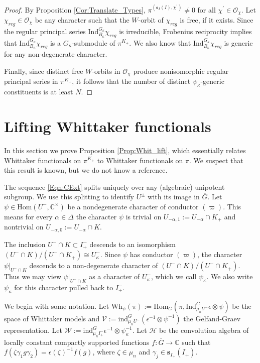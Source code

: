 \documentclass[11pt]{amsart}
\theoremstyle{plain}
\theoremstyle{definition}
\numberwithin{equation}{section}
\newcommand{\C}{\mathbb{C}}
\newcommand{\Gt}{\overline{G}}
\newcommand{\s}{\mathbf{s}}
\newcommand{\Ocal}{\mathcal{O}}
\newcommand{\Hcal}{\mathcal{H}}
\begin{document}
\begin{proof}
    By Proposition \ref{Cor:Translate_Types}, $\pi^{(\s_{I}(I),\chi^{\prime})}\neq 0$ for all $\chi^{\prime}\in \Ocal_{\chi}$. Let $\chi_{reg}\in \Ocal_{\chi}$ be any character such that the $W$-orbit of $\chi_{reg}$ is free, if it exists. Since the regular principal series $\mathrm{Ind}_{B_{\kappa}}^{G_{\kappa}}\chi_{reg}$ is irreducible, Frobenius reciprocity implies that  $\mathrm{Ind}_{B_{\kappa}}^{G_{\kappa}}\chi_{reg}$ is a $G_{\kappa}$-submodule of $\pi^{K_{+}}$. We also know that $\mathrm{Ind}_{B_{\kappa}}^{G_{\kappa}}\chi_{reg}$ is generic for any non-degenerate character. %

    Finally, since distinct free $W$-orbits in $\Ocal_{\chi}$ produce nonisomorphic regular principal series in $\pi^{K_{+}}$, it follows that the number of distinct $\psi_{\kappa}$-generic constituents is at least $N$.
\end{proof}

\section{Lifting Whittaker functionals}

In this section we prove Proposition \ref{Prop:Whit_lift}, which essentially relates Whittaker functionals on $\pi^{K_{+}}$ to Whittaker functionals on $\pi$. We suspect that this result is known, but we do not know a reference.

The sequence \eqref{Eqn:CExt} splits uniquely over any (algebraic) unipotent subgroup. We use this splitting to identify $U^{\pm}$ with its image in $\Gt$. Let $\psi\in\mathrm{Hom}(U^{-},\C^{\times})$ be a nondegenerate character of conductor $(\varpi)$. This means for every $\alpha\in\Delta$ the character $\psi$ is trivial on $U_{-\alpha,1}:=U_{-\alpha}\cap K_{+}$ and nontrivial on $U_{-\alpha,0}:=U_{-\alpha}\cap K$.

The inclusion $U^{-}\cap K\subset I^{-}_{+}$ descends to an isomorphism $(U^{-}\cap K)/(U^{-}\cap K_{+})\cong U^{-}_{\kappa}$. Since $\psi$ has conductor $(\varpi)$, the character $\psi|_{U^{-}\cap K}$ descends to a non-degenerate character of $(U^{-}\cap K)/(U^{-}\cap K_{+})$. Thus we may view $\psi|_{U^{-}\cap K}$ as a character of $U^{-}_{\kappa}$, which we call $\psi_{\kappa}$. We also write $\psi_{\kappa}$ for this character pulled back to $I^{-}_{+}$.

We begin with some notation. Let $\mathrm{Wh}_{\psi}(\pi):=\mathrm{Hom}_{G}(\pi,\mathrm{Ind}_{\mu_{n}U^{-}}^{G}\epsilon\otimes\psi)$ be the space of Whittaker models and $\mathcal{V}:=\mathrm{ind}_{\mu_{n}U^{-}}^{G}(\epsilon^{-1}\otimes\psi^{-1})$ the Gelfand-Graev representation. Let $\mathcal{W}:=\mathrm{ind}_{\mu_{n}I^{-}_{+}}^{G}\epsilon^{-1}\otimes\psi_{\kappa}^{-1}$. Let $\Hcal$ be the convolution algebra of locally constant compactly supported functions $f:\Gt\rightarrow \C$ such that $f(\zeta\gamma_{1}g\gamma_{2})=\epsilon(\zeta)^{-1}f(g)$, where $\zeta\in\mu_{n}$ and $\gamma_{j}\in \s_{I_{+}}(I_{+})$.
\end{document}
